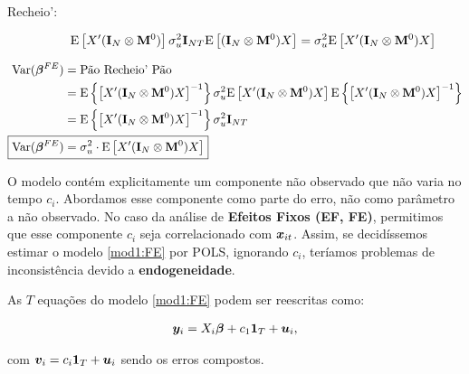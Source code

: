 \documentclass[11pt, oneside, a4paper, article]{article}
\numberwithin{equation}{section}
\begin{document}
\begin{description}
\item [Recheio':]
\begin{align*}
\text{E} \left[ X' ( \mathbf{I}_{N} \otimes \mathbf{M}^{0} ) \right]
\sigma^2_{u} \mathbf{I}_{NT}
\text{E} \left[ ( \mathbf{I}_{N} \otimes \mathbf{M}^{0} ) X \right]
=
\sigma^2_{u}
\text{E} \left[ X' ( \mathbf{I}_{N} \otimes \mathbf{M}^{0} ) X \right]
\end{align*}
\end{description}

\noindent
{}

\vspace{-2 em}
\begin{align*}
\Var( \betavec^{FE} ) &= \text{Pão Recheio' Pão} 
\\ &=
\E \left\{ \left[
X' ( \Imat_{N} \otimes \Mzero ) X
\right]^{-1} \right\}
\sigma_{u}^{2} \E\left[ X' ( \Imat_{N} \otimes \Mzero ) X \right]
\E \left\{ \left[
X' ( \Imat_{N} \otimes \Mzero ) X
\right]^{-1} \right\}
\\  &=
\E \left\{ \left[
X' ( \Imat_{N} \otimes \Mzero ) X
\right]^{-1} \right\}
\sigma_{u}^{2} \Imat_{NT}
\\
\Aboxed{ \Var( \betavec^{FE} ) &= \sigma_{u}^{2} \cdot  \E\left[ X' ( \Imat_{N} \otimes \Mzero ) X \right] }
\end{align*}


O modelo contém explicitamente um componente não observado que não varia no tempo $c_{i}$.
Abordamos esse componente como parte do erro, não como parâmetro a não observado.
No caso da análise de \textbf{Efeitos Fixos (EF, FE)}, permitimos que esse componente $c_{i}$ seja correlacionado com $\boldsymbol{x}_{it}$.
Assim, se decidíssemos estimar o modelo \eqref{mod1:FE} por POLS, ignorando $c_{i}$, teríamos problemas de inconsistência devido a \textbf{endogeneidade}.

As $T$ equações do modelo \eqref{mod1:FE} podem ser reescritas como:

\vspace{-1 em}
\begin{align} \label{mod2:FE}
	\boldsymbol{y}_{i} = X_{i} \boldsymbol{\beta} + c_{1} \boldsymbol{1}_{T} + \boldsymbol{u}_{i},
\end{align}

\noindent
com
$\boldsymbol{v}_{i} = c_{i} \boldsymbol{1}_{T} + \boldsymbol{u}_{i}$ sendo os erros compostos.
\end{document}
